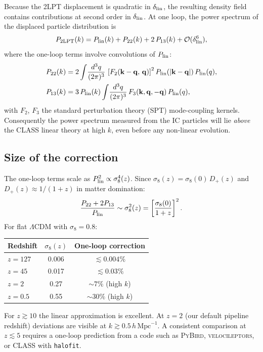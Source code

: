 \documentclass[12pt]{article}
\newcommand{\bk}{\mathbf{k}}
\newcommand{\Dp}{D_+}
\begin{document}
Because the 2LPT displacement is quadratic in $\delta_{\rm lin}$, the
resulting density field contains contributions at second order in
$\delta_{\rm lin}$.  At one loop, the power spectrum of the displaced
particle distribution is \citep{Bernardeau2002}
%
\begin{equation}
  P_{\rm 2LPT}(k)
    = P_{\rm lin}(k)
    + P_{22}(k)
    + 2\,P_{13}(k)
    + \mathcal{O}(\delta_{\rm lin}^6),
  \label{eq:pk_loop}
\end{equation}
%
where the one-loop terms involve convolutions of $P_{\rm lin}$:
%
\begin{align}
  P_{22}(k) &= 2\int\!\frac{d^3q}{(2\pi)^3}\,
    \left[F_2(\bk-\mathbf{q},\,\mathbf{q})\right]^2
    P_{\rm lin}(|\bk-\mathbf{q}|)\,P_{\rm lin}(q), \\
  P_{13}(k) &= 3\,P_{\rm lin}(k)\int\!\frac{d^3q}{(2\pi)^3}\,
    F_3(\bk,\mathbf{q},-\mathbf{q})\,P_{\rm lin}(q),
\end{align}
%
with $F_2$, $F_3$ the standard perturbation theory (SPT) mode-coupling
kernels.  Consequently the power spectrum measured from the IC
particles will lie \emph{above} the CLASS linear theory at high $k$,
even before any non-linear evolution.

\subsection{Size of the correction}

The one-loop terms scale as $P_{\rm lin}^2 \propto \sigma_8^4(z)$.
Since $\sigma_8(z) = \sigma_8(0)\,\Dp(z)$ and $\Dp(z) \approx
1/(1+z)$ in matter domination:
%
\begin{equation}
  \frac{P_{22}+2P_{13}}{P_{\rm lin}} \sim \sigma_8^2(z)
    = \left[\frac{\sigma_8(0)}{1+z}\right]^2.
\end{equation}
%
For flat $\Lambda$CDM with $\sigma_8 = 0.8$:
%
\begin{center}
\begin{tabular}{lcc}
\hline
Redshift & $\sigma_8(z)$ & One-loop correction \\
\hline
$z = 127$ & 0.006 & $\lesssim 0.004\%$ \\
$z = 45$  & 0.017 & $\lesssim 0.03\%$  \\
$z = 2$   & 0.27  & $\sim 7\%$ (high $k$) \\
$z = 0.5$ & 0.55  & $\sim 30\%$ (high $k$) \\
\hline
\end{tabular}
\end{center}
%
For $z \gtrsim 10$ the linear approximation is excellent.  At $z = 2$
(our default pipeline redshift) deviations are visible at $k \gtrsim
0.5\,h\,\mathrm{Mpc}^{-1}$.  A consistent comparison at $z \lesssim 5$
requires a one-loop prediction from a code such as \textsc{PyBird},
\textsc{velocileptors}, or CLASS with \texttt{halofit}.
\end{document}
